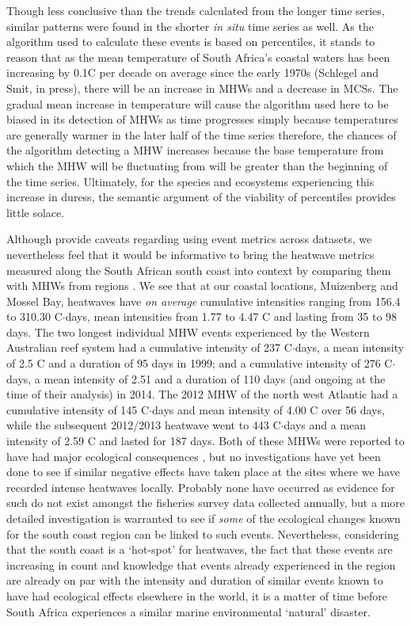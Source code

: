 \documentclass[a4paper,10pt,review]{elsarticle}
\begin{document}
Though less conclusive than the trends calculated from the longer time series, similar patterns were found in the shorter \emph{in situ} time series as well. As the algorithm used to calculate these events is based on percentiles, it stands to reason that as the mean temperature of South Africa's coastal waters has been increasing by 0.1\degree C per decade on average since the early 1970s (Schlegel and Smit, in press), there will be an increase in MHWs and a decrease in MCSs. The gradual mean increase in temperature will cause the algorithm used here to be biased in its detection of MHWs as time progresses simply because temperatures are generally warmer in the later half of the time series therefore, the chances of the algorithm detecting a MHW increases because the base temperature from which the MHW will be fluctuating from will be greater than the beginning of the time series. Ultimately, for the species and ecosystems experiencing this increase in duress, the semantic argument of the viability of percentiles provides little solace.

Although \citet{Hobday2016} provide caveats regarding using event metrics across datasets, we nevertheless feel that it would be informative to bring the heatwave metrics measured along the South African south coast into context by comparing them with MHWs from regions \citep[see][]{Hobday2016}. We see that at our coastal locations, Muizenberg and Mossel Bay, heatwaves have \emph{on average} cumulative intensities ranging from 156.4 to 310.30 \degree C$\cdot$days, mean intensities from 1.77 to 4.47 \degree C and lasting from 35 to 98 days. The two longest individual MHW events experienced by the Western Australian reef system \citep{Feng2013} had a cumulative intensity of 237 \degree C$\cdot$days, a mean intensity of 2.5 \degree C and a duration of 95 days in 1999; and a cumulative intensity of 276 \degree C$\cdot$days, a mean intensity of 2.51 and a duration of 110 days (and ongoing at the time of their analysis) in 2014. The 2012 MHW of the north west Atlantic \citep{Mills2012, Chen2014} had a cumulative intensity of 145 \degree C$\cdot$days and mean intensity of 4.00 \degree C over 56 days, while the subsequent 2012/2013 heatwave went to 443 \degree C$\cdot$days and a mean intensity of 2.59 \degree C and lasted for 187 days. Both of these MHWs were reported to have had major ecological consequences \citep{Feng2013, Mills2012, Chen2014}, but no investigations have yet been done to see if similar negative effects have taken place at the sites where we have recorded intense heatwaves locally. Probably none have occurred as evidence for such do not exist amongst the fisheries survey data collected annually, but a more detailed investigation is warranted to see if \emph{some} of the ecological changes known for the south coast region \citep{Bolton2012} can be linked to such events. Nevertheless, considering that the south coast is a `hot-spot' for heatwaves, the fact that these events are increasing in count and knowledge that events already experienced in the region are already on par with the intensity and duration of similar events known to have had ecological effects elsewhere in the world, it is a matter of time before South Africa experiences a similar marine environmental `natural' disaster.
\end{document}
